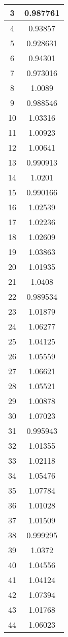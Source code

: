 \begin{table}[h]
\begin{subtable}[h]{2in}
{\begin{tabular}{|c|c|}
3	&	0.987761	\\	\hline
4	&	0.93857	\\	\hline
5	&	0.928631	\\	\hline
6	&	0.94301	\\	\hline
7	&	0.973016	\\	\hline
8	&	1.0089	\\	\hline
9	&	0.988546	\\	\hline
10	&	1.03316	\\	\hline
11	&	1.00923	\\	\hline
12	&	1.00641	\\	\hline
13	&	0.990913	\\	\hline
14	&	1.0201	\\	\hline
15	&	0.990166	\\	\hline
16	&	1.02539	\\	\hline
17	&	1.02236	\\	\hline
18	&	1.02609	\\	\hline
19	&	1.03863	\\	\hline
20	&	1.01935	\\	\hline
21	&	1.0408	\\	\hline
22	&	0.989534	\\	\hline
23	&	1.01879	\\	\hline
24	&	1.06277	\\	\hline
25	&	1.04125	\\	\hline
26	&	1.05559	\\	\hline
27	&	1.06621	\\	\hline
28	&	1.05521	\\	\hline
29	&	1.00878	\\	\hline
30	&	1.07023	\\	\hline
31	&	0.995943	\\	\hline
32	&	1.01355	\\	\hline
33	&	1.02118	\\	\hline
34	&	1.05476	\\	\hline
35	&	1.07784	\\	\hline
36	&	1.01028	\\	\hline
37	&	1.01509	\\	\hline
38	&	0.999295	\\	\hline
39	&	1.0372	\\	\hline
40	&	1.04556	\\	\hline
41	&	1.04124	\\	\hline
42	&	1.07394	\\	\hline
43	&	1.01768	\\	\hline
44	&	1.06023	\\	\hline

\end{tabular}}
\end{subtable}
\end{table}
